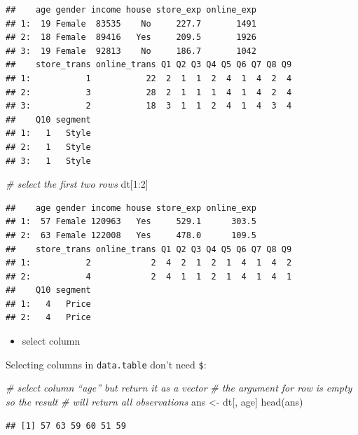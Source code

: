 \documentclass[
  12pt,
]{krantz}
\makeatletter
\newenvironment{Shaded}{\begin{snugshade}}{\end{snugshade}}
\newcommand{\CommentTok}[1]{\textcolor[rgb]{0.37,0.37,0.37}{\textit{#1}}}
\newcommand{\DecValTok}[1]{\textcolor[rgb]{0.06,0.06,0.06}{#1}}
\newcommand{\FunctionTok}[1]{\textcolor[rgb]{0,0,0}{#1}}
\newcommand{\NormalTok}[1]{#1}
\newcommand{\OtherTok}[1]{\textcolor[rgb]{0.37,0.37,0.37}{#1}}
\newcommand{\SpecialCharTok}[1]{\textcolor[rgb]{0,0,0}{#1}}
\providecommand{\tightlist}{%
  \setlength{\itemsep}{0pt}\setlength{\parskip}{0pt}}
\newenvironment{kframe}{%
\medskip{}
\setlength{\fboxsep}{.8em}
 \def\at@end@of@kframe{}%
 \ifinner\ifhmode%
  \def\at@end@of@kframe{\end{minipage}}%
  \begin{minipage}{\columnwidth}%
 \fi\fi%
 \def\FrameCommand##1{\hskip\@totalleftmargin \hskip-\fboxsep
 \colorbox{shadecolor}{##1}\hskip-\fboxsep
     \hskip-\linewidth \hskip-\@totalleftmargin \hskip\columnwidth}%
 \MakeFramed {\advance\hsize-\width
   \@totalleftmargin\z@ \linewidth\hsize
   \@setminipage}}%
 {\par\unskip\endMakeFramed%
 \at@end@of@kframe}
\renewenvironment{Shaded}{\begin{kframe}}{\end{kframe}}
\makeatother
\begin{document}
\begin{verbatim}
##    age gender income house store_exp online_exp
## 1:  19 Female  83535    No     227.7       1491
## 2:  18 Female  89416   Yes     209.5       1926
## 3:  19 Female  92813    No     186.7       1042
##    store_trans online_trans Q1 Q2 Q3 Q4 Q5 Q6 Q7 Q8 Q9
## 1:           1           22  2  1  1  2  4  1  4  2  4
## 2:           3           28  2  1  1  1  4  1  4  2  4
## 3:           2           18  3  1  1  2  4  1  4  3  4
##    Q10 segment
## 1:   1   Style
## 2:   1   Style
## 3:   1   Style
\end{verbatim}

\begin{Shaded}
\begin{Highlighting}[]
\CommentTok{\# select the first two rows}
\NormalTok{dt[}\DecValTok{1}\SpecialCharTok{:}\DecValTok{2}\NormalTok{]}
\end{Highlighting}
\end{Shaded}

\begin{verbatim}
##    age gender income house store_exp online_exp
## 1:  57 Female 120963   Yes     529.1      303.5
## 2:  63 Female 122008   Yes     478.0      109.5
##    store_trans online_trans Q1 Q2 Q3 Q4 Q5 Q6 Q7 Q8 Q9
## 1:           2            2  4  2  1  2  1  4  1  4  2
## 2:           4            2  4  1  1  2  1  4  1  4  1
##    Q10 segment
## 1:   4   Price
## 2:   4   Price
\end{verbatim}

\begin{itemize}
\tightlist
\item
  select column
\end{itemize}

Selecting columns in \texttt{data.table} don't need \texttt{\$}:

\begin{Shaded}
\begin{Highlighting}[]
\CommentTok{\# select column “age” but return it as a vector}
\CommentTok{\# the argument for row is empty so the result}
\CommentTok{\# will return all observations}
\NormalTok{ans }\OtherTok{\textless{}{-}}\NormalTok{ dt[, age]}
\FunctionTok{head}\NormalTok{(ans)}
\end{Highlighting}
\end{Shaded}

\begin{verbatim}
## [1] 57 63 59 60 51 59
\end{verbatim}
\end{document}
